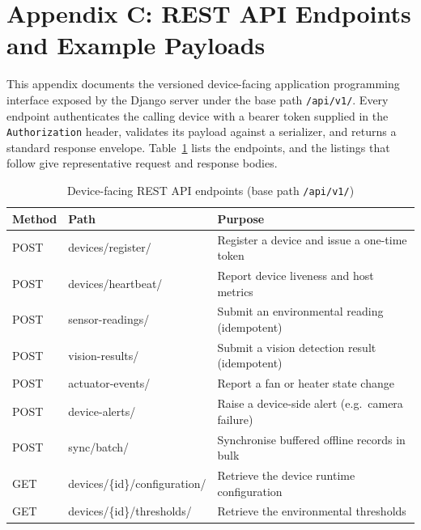 \documentclass[12pt,a4paper]{report}
\begin{document}
\clearpage


\setcounter{table}{0}
\setcounter{figure}{0}
\renewcommand{\thetable}{C.\arabic{table}}
\renewcommand{\thefigure}{C.\arabic{figure}}
\chapter*{Appendix C: REST API Endpoints and Example Payloads}

This appendix documents the versioned device-facing application programming interface exposed by the Django server under the base path \texttt{/api/v1/}. Every endpoint authenticates the calling device with a bearer token supplied in the \texttt{Authorization} header, validates its payload against a serializer, and returns a standard response envelope. Table~\ref{tab:apiendpoints} lists the endpoints, and the listings that follow give representative request and response bodies.

\begin{table}[H]
\centering
\caption{Device-facing REST API endpoints (base path \texttt{/api/v1/})}
\label{tab:apiendpoints}
\begin{tabularx}{\textwidth}{@{}l l X@{}}
\toprule
\textbf{Method} & \textbf{Path} & \textbf{Purpose} \\
\midrule
POST & devices/register/ & Register a device and issue a one-time token \\
POST & devices/heartbeat/ & Report device liveness and host metrics \\
POST & sensor-readings/ & Submit an environmental reading (idempotent) \\
POST & vision-results/ & Submit a vision detection result (idempotent) \\
POST & actuator-events/ & Report a fan or heater state change \\
POST & device-alerts/ & Raise a device-side alert (e.g.\ camera failure) \\
POST & sync/batch/ & Synchronise buffered offline records in bulk \\
GET  & devices/\{id\}/configuration/ & Retrieve the device runtime configuration \\
GET  & devices/\{id\}/thresholds/ & Retrieve the environmental thresholds \\
\bottomrule
\end{tabularx}
\end{table}
\end{document}
